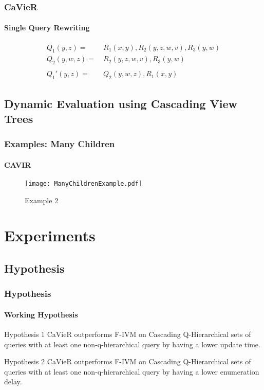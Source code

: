 \documentclass[
	11pt, %
]{beamer}
\begin{document}
\begin{frame}
	\frametitle{CaVieR}
	\framesubtitle{Single Query Rewriting}
	\begin{figure}
		\begin{align*}
			Q_1(y,z) =&\ R_1(x, y), R_2(y,z,w,v), R_3(y,w)\\
			Q_2(y,w,z) =&\ R_2(y,z,w,v), R_3(y,w)\\\\
			Q_1'(y,z) =&\ Q_2(y,w,z), R_1(x, y)
		\end{align*}
	\end{figure}
\end{frame}

\subsection{Dynamic Evaluation using Cascading View Trees}

\begin{frame}
	\frametitle{Examples: Many Children}
	\framesubtitle{CAVIR}
	\begin{figure}
		\texttt{[image: ManyChildrenExample.pdf]}
		\caption{Example 2}
	\end{figure}
\end{frame}

\section{Experiments}
\subsection{Hypothesis}
\begin{frame}
	\frametitle{Hypothesis}
	\framesubtitle{Working Hypothesis}
	\begin{block}{Hypothesis 1 }\label{hyp:initialUpdate}
		CaVieR outperforms F-IVM on Cascading Q-Hierarchical sets of queries with at least one non-q-hierarchical query by having a lower update time.
	\end{block}
	
	\begin{block}{Hypothesis 2}\label{hyp:initialEnumeration}
		CaVieR outperforms F-IVM on Cascading Q-Hierarchical sets of queries with at least one non-q-hierarchical query by having a lower enumeration delay.
	\end{block}

\end{frame}
\end{document}
